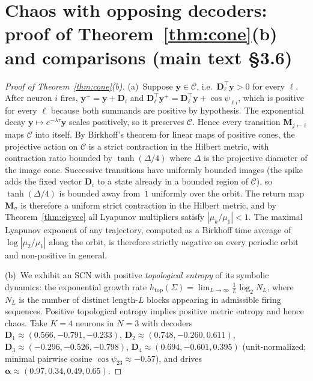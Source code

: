 \documentclass[12pt]{article}
\newcommand{\vv}[1]{\mathbf{#1}}
\newcommand{\DD}{\vv{D}}
\newcommand{\yy}{\vv{y}}
\begin{document}
\section{Chaos with opposing decoders: proof of Theorem~\ref{thm:cone}(b) and comparisons (main text \S 3.6)}\label{app:chaos-details}

\begin{proof}[Proof of Theorem~\ref{thm:cone}(b)]
(a)~Suppose $\yy\in\mathcal{C}$, i.e.\ $\DD_\ell^\top\yy>0$ for every $\ell$. After neuron $i$ fires, $\yy^+=\yy+\DD_i$ and $\DD_\ell^\top\yy^+=\DD_\ell^\top\yy+\cos\psi_{\ell i}$, which is positive for every $\ell$ because both summands are positive by hypothesis. The exponential decay $\yy\mapsto e^{-\lambda\tau}\yy$ scales positively, so it preserves $\mathcal{C}$. Hence every transition $\vv{M}_{j\leftarrow i}$ maps $\mathcal{C}$ into itself. By Birkhoff's theorem for linear maps of positive cones, the projective action on $\mathcal{C}$ is a strict contraction in the Hilbert metric, with contraction ratio bounded by $\tanh(\Delta/4)$ where $\Delta$ is the projective diameter of the image cone. Successive transitions have uniformly bounded images (the spike adds the fixed vector $\DD_i$ to a state already in a bounded region of $\mathcal{C}$), so $\tanh(\Delta/4)$ is bounded away from~$1$ uniformly over the orbit. The return map $\vv{M}_\sigma$ is therefore a uniform strict contraction in the Hilbert metric, and by Theorem~\ref{thm:eigvec} all Lyapunov multipliers satisfy $|\mu_k/\mu_1|<1$. The maximal Lyapunov exponent of any trajectory, computed as a Birkhoff time average of $\log|\mu_2/\mu_1|$ along the orbit, is therefore strictly negative on every periodic orbit and non-positive in general.

(b)~We exhibit an SCN with positive \emph{topological entropy} of its symbolic dynamics: the exponential growth rate $h_{\text{top}}(\Sigma)=\lim_{L\to\infty}\frac{1}{L}\log_2 N_L$, where $N_L$ is the number of distinct length-$L$ blocks appearing in admissible firing sequences. Positive topological entropy implies positive metric entropy and hence chaos. Take $K=4$ neurons in $N=3$ with decoders
$\DD_1\approx(0.566,-0.791,-0.233)$,
$\DD_2\approx(0.748,-0.260,0.611)$,
$\DD_3\approx(-0.296,-0.526,-0.798)$,
$\DD_4\approx(0.694,-0.601,0.395)$ (unit-normalized; minimal pairwise cosine $\cos\psi_{23}\approx-0.57$), and drives $\boldsymbol{\alpha}\approx(0.97,0.34,0.49,0.65)$.


\end{proof}
\end{document}
